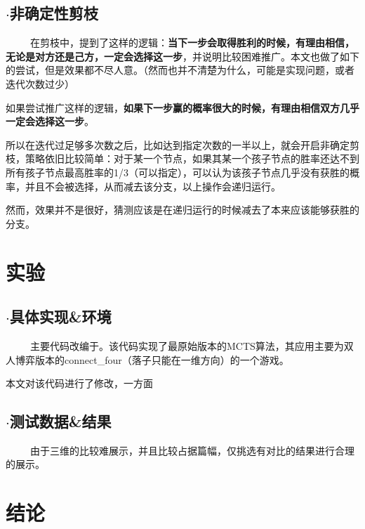 \documentclass[9pt,twocolumn,twoside]{osajnl}
\begin{document}
\subsection{$\cdot$非确定性剪枝}
\begin{adjustwidth}{2em}{}	
	\ \ \ \ \
		在剪枝中，提到了这样的逻辑：\textbf{当下一步会取得胜利的时候，有理由相信，无论是对方还是己方，一定会选择这一步}，并说明比较困难推广。本文也做了如下的尝试，但是效果都不尽人意。（然而也并不清楚为什么，可能是实现问题，或者迭代次数过少）
		
		如果尝试推广这样的逻辑，\textbf{如果下一步赢的概率很大的时候，有理由相信双方几乎一定会选择这一步}。
		
		所以在迭代过足够多次数之后，比如达到指定次数的一半以上，就会开启非确定剪枝，策略依旧比较简单：对于某一个节点，如果其某一个孩子节点的胜率还达不到所有孩子节点最高胜率的1/3（可以指定），可以认为该孩子节点几乎没有获胜的概率，并且不会被选择，从而减去该分支，以上操作会递归运行。
		
		然而，效果并不是很好，猜测应该是在递归运行的时候减去了本来应该能够获胜的分支。
\end{adjustwidth}

\section{实验}

\subsection{$\cdot$具体实现\&环境}
\begin{adjustwidth}{2em}{}	
	\ \ \ \ \
	主要代码改编于\cite{MCTSbasecode}。该代码实现了最原始版本的MCTS算法，其应用主要为双人博弈版本的connect\_four（落子只能在一维方向）的一个游戏。
	
	本文对该代码进行了修改，一方面
	
\end{adjustwidth}
\subsection{$\cdot$测试数据\&结果}

\begin{adjustwidth}{2em}{}	
	\ \ \ \ \
由于三维的比较难展示，并且比较占据篇幅，仅挑选有对比的结果进行合理的展示。	
\end{adjustwidth}
\section{结论}
\end{document}
